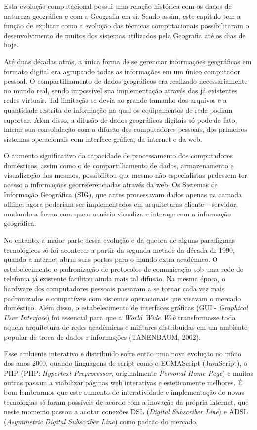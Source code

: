 Esta evolução computacional possui uma relação histórica com os dados de natureza geográfica e com a Geografia em si. Sendo assim, este capítulo tem a função de explicar como a evolução das técnicas computacionais possibilitaram o desenvolvimento de muitos dos sistemas utilizados pela Geografia até os dias de hoje. 

Até duas décadas atrás, a única forma de se gerenciar informações geográficas em formato digital era agrupando todas as informações em um único computador pessoal. O compartilhamento de dados geográficos era realizado necessariamente no mundo real, sendo impossível sua implementação através das já existentes redes virtuais. Tal limitação se devia ao grande tamanho dos arquivos e a quantidade restrita de informação na qual os equipamentos de rede podiam suportar. Além disso, a difusão de dados geográficos digitais só pode de fato,  iniciar sua consolidação com a difusão dos computadores pessoais, dos primeiros sistemas operacionais com interface gráfica, da internet e da web. 

O aumento significativo da capacidade de processamento dos computadores domésticos, assim como o de compartilhamento de dados, armazenamento e visualização dos mesmos, possibilitou que mesmo não especialistas pudessem ter acesso a informações georreferenciadas  através da web. Os Sistemas de Informação Geográfica (SIG), que antes processavam dados apenas na camada offline, agora poderiam ser implementados em arquiteturas cliente – servidor, mudando a forma com que o usuário visualiza e interage com a informação geográfica. 

No entanto, a maior parte dessa evolução e da quebra de alguns paradigmas tecnológicos só foi acontecer a partir da segunda metade da década de 1990, quando a internet abriu suas portas para o mundo extra acadêmico. O estabelecimento e padronização de protocolos de comunicação sob uma rede de telefonia já existente facilitou ainda mais tal difusão. Na mesma época, o hardware dos computadores pessoais passaram a se tornar cada vez mais padronizados e compatíveis com sistemas operacionais que visavam o mercado doméstico. Além disso, o estabelecimento de interfaces gráficas (GUI - \textit{Graphical User Interface}) foi essencial para que a \textit{World Wide Web} transformasse toda aquela arquitetura de redes acadêmicas e militares distribuídas em um ambiente popular de troca de dados e informações (TANENBAUM, 2002)\cite{TANENBAUM_02}.

Esse ambiente interativo e distribuído sofre então uma nova evolução no início dos anos 2000, quando linguagens de script como o ECMAScript (JavaScript), o PHP (PHP: \textit{Hypertext Preprocessor}, originalmente \textit{Personal Home Page}) e muitas outras passam a viabilizar páginas web interativas e esteticamente melhores. É bom lembrarmos que este aumento de interatividade e implementação de novas tecnologias só foram possíveis de acordo com a inovação da própria internet, que neste momento passou a adotar conexões DSL (\textit{Digital Subscriber Line}) e ADSL (\textit{Asymmetric Digital Subscriber Line}) como padrão do mercado. 

